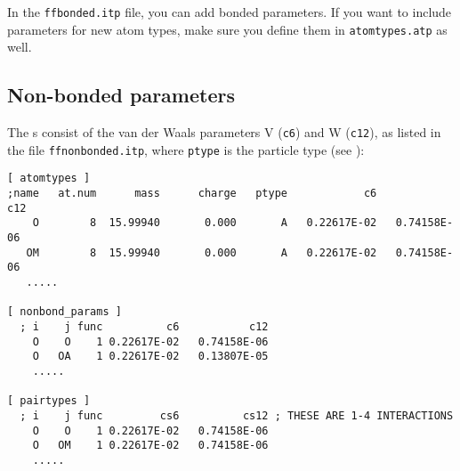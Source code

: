 In the {\tt ffbonded.itp} file, you can add bonded parameters. If you
want to include parameters for new atom types, make sure you define
them in {\tt atomtypes.atp} as well.

\subsection{Non-bonded parameters}
\label{subsec:nbpar}
The s consist of the van der Waals parameters
V ({\tt c6}) and W ({\tt c12}), as listed in the file {\tt ffnonbonded.itp},
where {\tt ptype} is the particle type (see ):

{\small
\begin{verbatim}
[ atomtypes ]
;name   at.num      mass      charge   ptype            c6           c12
    O        8  15.99940       0.000       A   0.22617E-02   0.74158E-06
   OM        8  15.99940       0.000       A   0.22617E-02   0.74158E-06
   .....

[ nonbond_params ]
  ; i    j func          c6           c12
    O    O    1 0.22617E-02   0.74158E-06
    O   OA    1 0.22617E-02   0.13807E-05
    .....

[ pairtypes ]
  ; i    j func         cs6          cs12 ; THESE ARE 1-4 INTERACTIONS
    O    O    1 0.22617E-02   0.74158E-06
    O   OM    1 0.22617E-02   0.74158E-06
    .....
\end{verbatim}}

